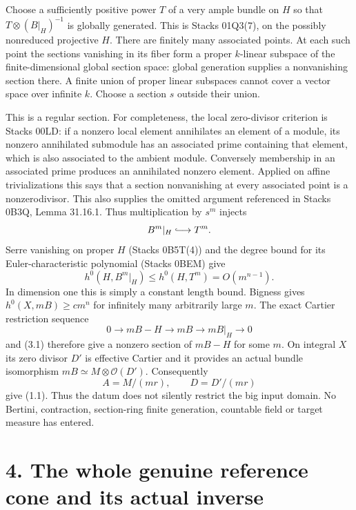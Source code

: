 \documentclass[
  10pt,
]{article}
\begin{document}
Choose a sufficiently positive power \(T\) of a very ample bundle on
\(H\) so that \(T\otimes(B|_H)^{-1}\) is globally generated. This is
Stacks 01Q3(7), on the possibly nonreduced projective \(H\). There are
finitely many associated points. At each such point the sections
vanishing in its fiber form a proper \(k\)-linear subspace of the
finite-dimensional global section space: global generation supplies a
nonvanishing section there. A finite union of proper linear subspaces
cannot cover a vector space over infinite \(k\). Choose a section \(s\)
outside their union.

This is a regular section. For completeness, the local zero-divisor
criterion is Stacks 00LD: if a nonzero local element annihilates an
element of a module, its nonzero annihilated submodule has an associated
prime containing that element, which is also associated to the ambient
module. Conversely membership in an associated prime produces an
annihilated nonzero element. Applied on affine trivializations this says
that a section nonvanishing at every associated point is a
nonzerodivisor. This also supplies the omitted argument referenced in
Stacks 0B3Q, Lemma 31.16.1. Thus multiplication by \(s^m\) injects \[
                 B^m|_H\lhook\joinrel\longrightarrow T^m.
\] Serre vanishing on proper \(H\) (Stacks 0B5T(4)) and the degree bound
for its Euler-characteristic polynomial (Stacks 0BEM) give \[
 h^0(H,B^m|_H)\leq h^0(H,T^m)=O(m^{n-1}).                     \tag{3.1}
\] In dimension one this is simply a constant length bound. Bigness
gives \(h^0(X,mB)\geq c m^n\) for infinitely many arbitrarily large
\(m\). The exact Cartier restriction sequence \[
 0\longrightarrow mB-H\longrightarrow mB\longrightarrow mB|_H
                 \longrightarrow0
\] and (3.1) therefore give a nonzero section of \(mB-H\) for some
\(m\). On integral \(X\) its zero divisor \(D'\) is effective Cartier
and it provides an actual bundle isomorphism
\(mB\simeq M\otimes\mathcal O(D')\). Consequently \[
                 A=M/(mr),\qquad D=D'/(mr)
\] give (1.1). Thus the datum does not silently restrict the big input
domain. No Bertini, contraction, section-ring finite generation,
countable field or target measure has entered.

\section{4. The whole genuine reference cone and its actual
inverse}\label{the-whole-genuine-reference-cone-and-its-actual-inverse}
\end{document}
